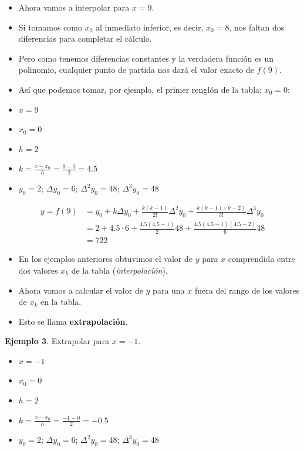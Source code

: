 \documentclass[openany]{book}
\providecommand{\tightlist}{%
  \setlength{\itemsep}{0pt}\setlength{\parskip}{0pt}}
\begin{document}
\begin{itemize}
\tightlist
\item
  Ahora vamos a interpolar para \(x = 9\).
\item
  Si tomamos como \(x_0\) al inmediato inferior, es decir, \(x_0 = 8\), nos faltan dos diferencias para completar el cálculo.
\item
  Pero como tenemos diferencias constantes y la verdadera función es un polinomio, cualquier punto de partida nos dará el valor exacto de \(f(9)\).
\item
  Así que podemos tomar, por ejemplo, el primer renglón de la tabla: \(x_0=0\):
\item
  \(x = 9\)
\item
  \(x_0 = 0\)
\item
  \(h = 2\)
\item
  \(k = \frac{x-x_0}{h} = \frac{9-0}{2} = 4.5\)
\item
  \(y_0 = 2\); \(\Delta y_0 = 6\); \(\Delta^2 y_0 = 48\); \(\Delta^3 y_0 = 48\)
\end{itemize}

\[
\begin{aligned}
y = f(9) &= y_0 + k \Delta y_0 + \frac{k(k-1)}{2!}\Delta^2 y_0 + \frac{k(k-1)(k-2)}{3!}\Delta^3 y_0\\
  & = 2 + 4.5 \cdot 6 + \frac{4.5 (4.5-1)}{2} 48 + \frac{4.5 (4.5-1)(4.5-2)}{6} 48 \\
  & = 722
\end{aligned}
\]

\begin{itemize}
\tightlist
\item
  En los ejemplos anteriores obtuvimos el valor de \(y\) para \(x\) comprendida entre dos valores \(x_k\) de la tabla (\emph{interpolación}).
\item
  Ahora vamos a calcular el valor de \(y\) para una \(x\) fuera del rango de los valores de \(x_k\) en la tabla.
\item
  Esto se llama \textbf{extrapolación}.
\end{itemize}

\textbf{Ejemplo 3}. Extrapolar para \(x = -1\).

\begin{itemize}
\tightlist
\item
  \(x = -1\)
\item
  \(x_0 = 0\)
\item
  \(h = 2\)
\item
  \(k = \frac{x-x_0}{h} = \frac{-1-0}{2} = -0.5\)
\item
  \(y_0 = 2\); \(\Delta y_0 = 6\); \(\Delta^2 y_0 = 48\); \(\Delta^3 y_0 = 48\)
\end{itemize}
\end{document}
